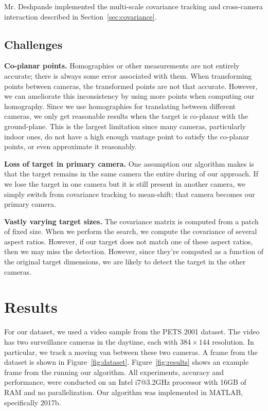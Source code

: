 \documentclass{article}
\begin{document}
Mr. Deshpande implemented the multi-scale covariance tracking and cross-camera interaction described in Section~\ref{sec:covariance}.

\subsection{Challenges}
\vspace{5pt}
\noindent\textbf{Co-planar points.} Homographies or other measurements are not entirely accurate; there is always some error associated with them. When transforming points between cameras, the transformed points are not that accurate. However, we can ameliorate this inconsistency by using more points when computing our homography. Since we use homographies for translating between different cameras, we only get reasonable results when the target is co-planar with the ground-plane. This is the largest limitation since many cameras, particularly indoor ones, do not have a high enough vantage point to satisfy the co-planar points, or even approximate it reasonably.

\vspace{5pt}
\noindent\textbf{Loss of target in primary camera.} One assumption our algorithm makes is that the target remains in the same camera the entire during of our approach. If we lose the target in one camera but it is still present in another camera, we simply switch from covariance tracking to mean-shift; that camera becomes our primary camera.

\vspace{5pt}
\noindent\textbf{Vastly varying target sizes.} The covariance matrix is computed from a patch of fixed size. When we perform the search, we compute the covariance of several aspect ratios. However, if our target does not match one of these aspect ratios, then we may miss the detection. However, since they're computed as a function of the original target dimensions, we are likely to detect the target in the other cameras.

\section{Results}
\label{sec:results}
For our dataset, we used a video sample from the PETS 2001 dataset. The video has two surveillance cameras in the daytime, each with $384\times 144$ resolution. In particular, we track a moving van between these two cameras. A frame from the dataset is shown in Figure~\ref{fig:dataset}. Figure~\ref{fig:results} shows an example frame from the running our algorithm. All experiments, accuracy and performance, were conducted on an Intel i7@3.2GHz processor with 16GB of RAM and no parallelization. Our algorithm was implemented in MATLAB, specifically 2017b.
\end{document}
